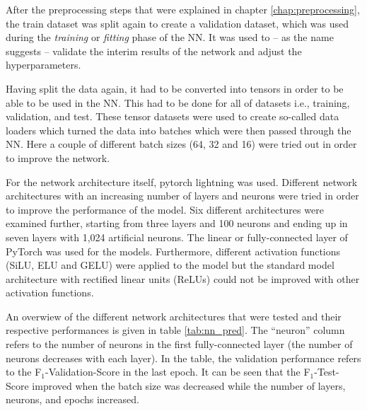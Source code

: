 After the preprocessing steps that were explained in chapter \ref{chap:preprocessing}, the train dataset was split again to create a validation dataset, which was used during the \textit{training} or \textit{fitting} phase of the NN. It was used to -- as the name suggests -- validate the interim results of the network and adjust the hyperparameters. \citep[][p. 184]{TanPang-Ning2006}

Having split the data again, it had to be converted into tensors in order to be able to be used in the NN. This had to be done for all of datasets i.e., training, validation, and test. These tensor datasets were used to create so-called data loaders which turned the data into batches which were then passed through the NN. Here a couple of different batch sizes (64, 32 and 16) were tried out in order to improve the network.

For the network architecture itself, pytorch lightning was used. Different network architectures with an increasing number of layers and neurons were tried in order to improve the performance of the model. Six different architectures were examined further, starting from three layers and 100 neurons and ending up in seven layers with 1,024 artificial neurons. The linear or fully-connected layer of PyTorch was used for the models. \citep{PyTorch2019, PyTorch2021} Furthermore, different activation functions (SiLU, ELU and GELU) were applied to the model but the standard model architecture with rectified linear units (ReLUs) could not be improved with other activation functions.

An overwiew of the different network architectures that were tested and their respective performances is given in table \ref{tab:nn_pred}. The \enquote{neuron} column refers to the number of neurons in the first fully-connected layer (the number of neurons decreases with each layer). In the table, the validation performance refers to the F$_1$-Validation-Score in the last epoch. It can be seen that the F$_1$-Test-Score improved when the batch size was decreased while the number of layers, neurons, and epochs increased.